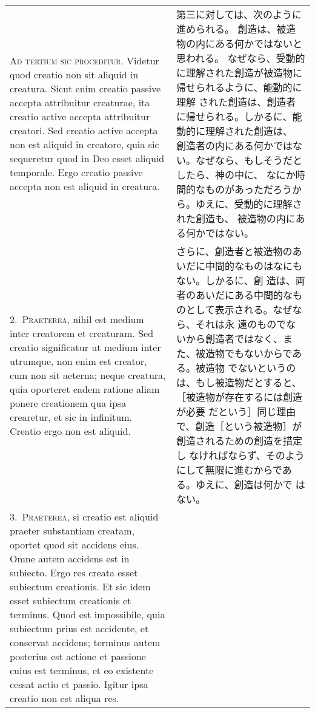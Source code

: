 \documentclass[10pt]{jsarticle} %
\begin{document}
\begin{longtable}{p{21em}p{21em}}

{\huge A}{\scshape d tertium sic proceditur}. Videtur quod creatio non sit aliquid in
 creatura. Sicut enim creatio passive accepta attribuitur creaturae, ita
 creatio active accepta attribuitur creatori. Sed creatio active accepta
 non est aliquid in creatore, quia sic sequeretur quod in Deo esset
 aliquid temporale. Ergo creatio passive accepta non est aliquid in
 creatura.

&

第三に対しては、次のように進められる。
創造は、被造物の内にある何かではないと思われる。
なぜなら、受動的に理解された創造が被造物に帰せられるように、能動的に理解
 された創造は、創造者に帰せられる。しかるに、能動的に理解された創造は、
 創造者の内にある何かではない。なぜなら、もしそうだとしたら、神の中に、
 なにか時間的なものがあっただろうから。ゆえに、受動的に理解された創造も、
 被造物の内にある何かではない。



\\

2.~{\scshape Praeterea}, nihil est medium inter creatorem et creaturam. Sed creatio
 significatur ut medium inter utrumque, non enim est creator, cum non
 sit aeterna; neque creatura, quia oporteret eadem ratione aliam ponere
 creationem qua ipsa crearetur, et sic in infinitum. Creatio ergo non
 est aliquid.

& さらに、創造者と被造物のあいだに中間的なものはなにもない。しかるに、創
造は、両者のあいだにある中間的なものとして表示される。なぜなら、それは永
遠のものでないから創造者ではなく、また、被造物でもないからである。被造物
でないというのは、もし被造物だとすると、［被造物が存在するには創造が必要
だという］同じ理由で、創造［という被造物］が創造されるための創造を措定し
なければならず、そのようにして無限に進むからである。ゆえに、創造は何かで
はない。

\\

3.~{\scshape Praeterea}, si creatio est aliquid praeter substantiam creatam, oportet
 quod sit accidens eius. Omne autem accidens est in subiecto. Ergo res
 creata esset subiectum creationis. Et sic idem esset subiectum
 creationis et terminus. Quod est impossibile, quia subiectum prius est
 accidente, et conservat accidens; terminus autem posterius est actione
 et passione cuius est terminus, et eo existente cessat actio et
 passio. Igitur ipsa creatio non est aliqua res.

&


\end{longtable}
\end{document}
